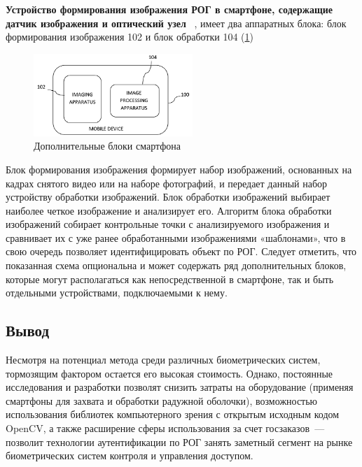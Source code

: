 \documentclass[10pt, a5paper]{article}
\begin{document}
\textbf{Устройство формирования изображения РОГ в смартфоне, содержащие датчик изображения и оптический узел} ~\cite{Kharkevich-3}, имеет два аппаратных блока: блок формирования изображения 102 и блок обработки 104 (\ref{fig:Kharkevich4})

\begin{center}
\begin{figure}[h!]
  \centering
  \includegraphics[width=6cm]{w_09_2018_Kharkevich4.png}
  \caption{Дополнительные блоки смартфона}
  \label{fig:Kharkevich4}
\end{figure}
\end{center} 

Блок формирования изображения формирует набор изображений, основанных на кадрах снятого видео или на наборе фотографий, и передает данный набор устройству обработки изображений. Блок обработки изображений выбирает наиболее четкое изображение и анализирует его. Алгоритм блока обработки изображений собирает контрольные точки с анализируемого изображения и сравнивает их с уже ранее обработанными изображениями «шаблонами», что в свою очередь позволяет идентифицировать объект по РОГ.
Следует отметить, что показанная схема опциональна и может содержать ряд дополнительных блоков, которые могут располагаться как непосредственной в смартфоне, так и быть отдельными устройствами, подключаемыми к нему.

\subsection*{Вывод}
Несмотря на потенциал метода среди различных биометрических систем, тормозящим фактором остается его высокая стоимость. Однако, постоянные исследования и разработки позволят снизить затраты на оборудование (применяя смартфоны для захвата и обработки радужной оболочки), возможностью использования библиотек компьютерного зрения с открытым исходным кодом OpenCV, а также расширение сферы использования за счет госзаказов~--- позволит технологии аутентификации по РОГ занять заметный сегмент на рынке биометрических систем контроля и управления доступом.
\end{document}
